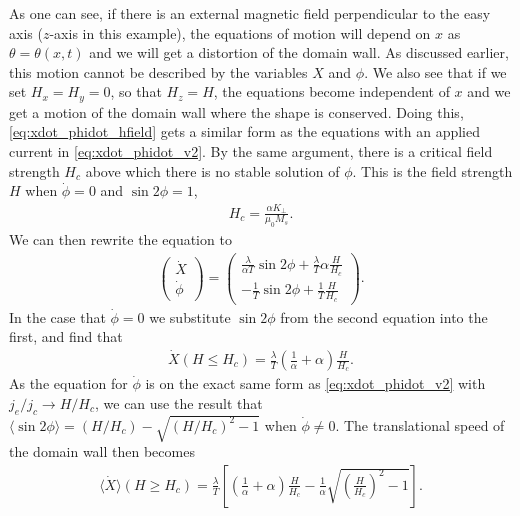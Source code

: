 \documentclass[12pt, a4paper]{article}		%
\numberwithin{equation}{section}
\begin{document}
As one can see, if there is an external magnetic field perpendicular to the easy axis ($z$-axis in this example), the equations of motion will depend on $x$ as $\theta = \theta(x,t)$ and we will get a distortion of the domain wall. As discussed earlier, this motion cannot be described by the variables $X$ and $\phi$. We also see that if we set $H_x = H_y = 0$, so that $H_z = H$, the equations become independent of $x$ and we get a motion of the domain wall where the shape is conserved. Doing this, \eqref{eq:xdot_phidot_hfield} gets a similar form as the equations with an applied current in \eqref{eq:xdot_phidot_v2}. By the same argument, there is a critical field strength $H_c$ above which there is no stable solution of $\phi$. This is the field strength $H$ when $\dot{\phi}=0$ and $\sin2\phi=1$, 
\begin{align}
\label{eq:Hcrit}
H_c = \frac{\alpha K_{\perp}}{\mu_0 M_s}.
\end{align}
We can then rewrite the equation to
\begin{align}
\label{eq:xdot_phidot_hz}
\begin{pmatrix}
\dot{X} \\ \dot{\phi}
\end{pmatrix} = 
\begin{pmatrix}
\frac{\lambda}{\alpha T} \sin2\phi  + \frac{\lambda}{T} \alpha \frac{H}{H_c} \\
-\frac{1}{T}\sin2\phi + \frac{1}{T}\frac{H}{H_c}
\end{pmatrix}.
\end{align}
In the case that $\dot{\phi}=0$ we substitute $\sin2\phi$ from the second equation into the first, and find that
\begin{align}
\dot{X}(H\leq H_c) = \frac{\lambda}{T}(\frac{1}{\alpha}+\alpha) \frac{H}{H_c}.
\end{align}
As the equation for $\dot{\phi}$ is on the exact same form as \eqref{eq:xdot_phidot_v2} with $j_e/j_c \rightarrow H/H_c$, we can use the result that $\langle\sin2\phi\rangle = (H/H_c)- \sqrt{(H/H_c)^2-1}$ when $\dot{\phi} \neq 0$. The translational speed of the domain wall then becomes
\begin{align}
\langle\dot{X}\rangle (H\geq H_c) = \frac{\lambda}{T} \left[(\frac{1}{\alpha}+\alpha) \frac{H}{H_c} - \frac{1}{\alpha}\sqrt{(\frac{H}{H_c})^2-1} \right].
\end{align}
\end{document}

